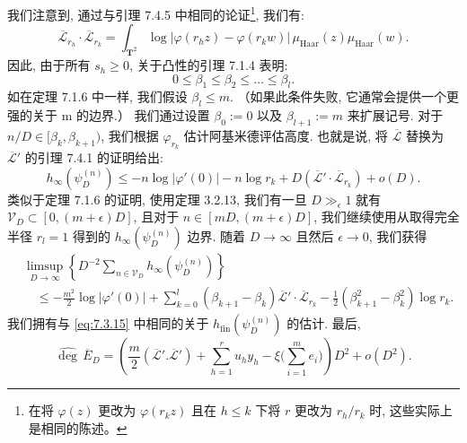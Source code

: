 我们注意到, 通过与引理 7.4.5 中相同的论证\footnote{在将 \(\varphi(z)\) 更改为 \(\varphi(r_k z)\) 且在 \(h \le k\) 下将 \(r\) 更改为 \(r_h/r_k\) 时, 这些实际上是相同的陈述。}, 我们有:
\[ \overline{\mathcal{L}}_{r_h} \cdot \overline{\mathcal{L}}_{r_k} = \int_{\mathbf{T}^2} \log |\varphi(r_h z) - \varphi(r_k w)| \, \mu_{\text{Haar}}(z) \mu_{\text{Haar}}(w). \]
因此, 由于所有 \(s_h \geq 0\), 关于凸性的引理 7.1.4 表明:
\[ 0 \le \beta_1 \le \beta_2 \le \dots \le \beta_l. \]
如在定理 7.1.6 中一样, 我们假设 \(\beta_l \leq m\). （如果此条件失败, 它通常会提供一个更强的关于 m 的边界.） 
我们通过设置 \(\beta_0 := 0\) 以及 \(\beta_{l+1} := m\) 来扩展记号. 
对于 \(n/D \in [\beta_k, \beta_{k+1})\), 我们根据 \(\varphi_{r_k}\) 估计阿基米德评估高度. 
也就是说, 将 \(\overline{\mathcal{L}}\) 替换为 \(\overline{\mathcal{L}}'\) 的引理 7.4.1 的证明给出:
\[ h_{\infty}(\psi_D^{(n)}) \le -n \log |\varphi'(0)| - n \log r_k + D(\overline{\mathcal{L}}' \cdot \overline{\mathcal{L}}_{r_k}) + o(D). \]
类似于定理 7.1.6 的证明, 使用定理 3.2.13, 我们有一旦 \(D \gg_{\epsilon} 1\) 就有 \(\mathcal{V}_D \subset [0, (m+\epsilon)D]\), 
且对于 \(n \in [mD, (m+\epsilon)D]\), 我们继续使用从取得完全半径 \(r_l = 1\) 得到的 \(h_\infty(\psi_D^{(n)})\) 边界. 
随着 \(D \to \infty\) 且然后 \(\epsilon \to 0\), 我们获得
\[
\begin{aligned}
&\limsup_{D \to \infty} \left\{ D^{-2} \sum_{n \in \mathcal{V}_D} h_{\infty}(\psi_D^{(n)}) \right\} \\
&\quad \le -\frac{m^2}{2} \log |\varphi'(0)| + \sum_{k=0}^{l} (\beta_{k+1} - \beta_k) \overline{\mathcal{L}}' \cdot \overline{\mathcal{L}}_{r_k} - \frac{1}{2} (\beta_{k+1}^2 - \beta_k^2) \log r_k.
\end{aligned}
\]
我们拥有与 \eqref{eq:7.3.15} 中相同的关于 \(h_{\text{fin}}(\psi_D^{(n)})\) 的估计. 最后,
\[ \widehat{\operatorname{deg}}\,\overline{E}_D = \left(\frac{m}{2}(\overline{\mathcal{L}}'.\overline{\mathcal{L}}') + \sum_{h=1}^r u_h y_h - \xi\Big(\sum_{i=1}^m e_i\Big)\right) D^2 + o(D^2). \]

